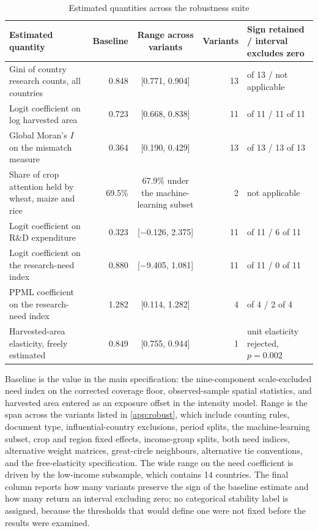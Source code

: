 \begin{table}[!t]
\centering
\footnotesize
\caption{Estimated quantities across the robustness suite}
\label{tab:robust}
\begin{tabular}{@{}>{\raggedright\arraybackslash}p{5.1cm} r c r >{\raggedright\arraybackslash}p{3.9cm}@{}}
\toprule
Estimated quantity & Baseline & Range across variants & Variants & Sign retained / interval excludes zero \\
\midrule
Gini of country research counts, all countries & 0.848 & [0.771, 0.904] & 13 & 13 of 13 / not applicable \\
Logit coefficient on log harvested area & 0.723 & [0.668, 0.838] & 11 & 11 of 11 / 11 of 11 \\
Global Moran's $I$ on the mismatch measure & 0.364 & [0.190, 0.429] & 13 & 13 of 13 / 13 of 13 \\
Share of crop attention held by wheat, maize and rice & 69.5\% & 67.9\% under the machine-learning subset & 2 & not applicable \\
Logit coefficient on R\&D expenditure & 0.323 & [$-$0.126, 2.375] & 11 & 10 of 11 / 6 of 11 \\
Logit coefficient on the research-need index & 0.880 & [$-$9.405, 1.081] & 11 & 10 of 11 / 0 of 11 \\
PPML coefficient on the research-need index & 1.282 & [0.114, 1.282] & 4 & 4 of 4 / 2 of 4 \\
Harvested-area elasticity, freely estimated & 0.849 & [0.755, 0.944] & 1 & unit elasticity rejected, $p=0.002$ \\
\bottomrule
\end{tabular}
\begin{tablenotes}
\item[] Baseline is the value in the main specification: the nine-component scale-excluded need index on the corrected coverage floor, observed-sample spatial statistics, and harvested area entered as an exposure offset in the intensity model. Range is the span across the variants listed in \ref{app:robust}, which include counting rules, document type, influential-country exclusions, period splits, the machine-learning subset, crop and region fixed effects, income-group splits, both need indices, alternative weight matrices, great-circle neighbours, alternative tie conventions, and the free-elasticity specification. The wide range on the need coefficient is driven by the low-income subsample, which contains 14 countries. The final column reports how many variants preserve the sign of the baseline estimate and how many return an interval excluding zero; no categorical stability label is assigned, because the thresholds that would define one were not fixed before the results were examined.
\end{tablenotes}
\end{table}
